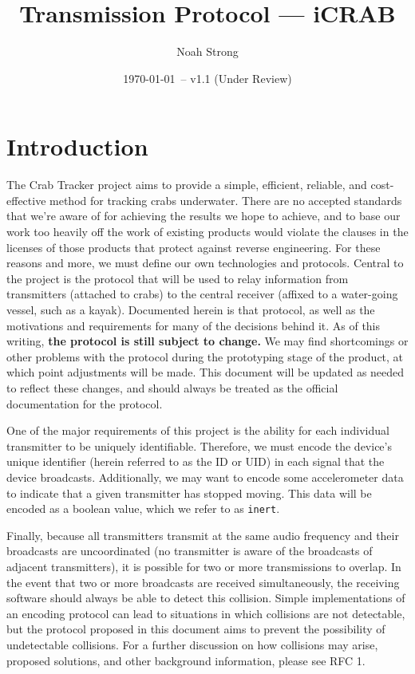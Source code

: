 \documentclass[12pt]{article}
\title{Transmission Protocol --- iCRAB}
\author{
	Noah Strong
}
\date{\today\ -- v1.1 (Under Review)}
\begin{document}
\maketitle

\tableofcontents{}

\newpage

\section{Introduction} \label{introduction}

The Crab Tracker project aims to provide a simple, efficient, reliable, and
cost-effective method for tracking crabs underwater. There are no accepted
standards that we're aware of for achieving the results we hope to achieve,
and to base our work too heavily off the work of existing products would
violate the clauses in the licenses of those products that protect against
reverse engineering.
For these reasons and more, we must define our own technologies and protocols.
Central to the project is the protocol that will be used to relay information
from transmitters (attached to crabs) to the central receiver (affixed to a
water-going vessel, such as a kayak).
Documented herein is that protocol, as well as the motivations and requirements
for many of the decisions behind it.
As of this writing, {\bf the protocol is still subject to change.}
We may find shortcomings or other problems with the protocol during
the prototyping stage of the product, at which point adjustments will be made.
This document will be updated as needed to reflect these changes,
and should always be treated as the official documentation for the protocol.

One of the major requirements of this project is the ability for each
individual transmitter to be uniquely identifiable. Therefore, we must encode
the device's unique identifier (herein referred to as the ID or UID) in each
signal that the device broadcasts.
Additionally, we may want to encode some accelerometer data to indicate that a
given transmitter has stopped moving.
This data will be encoded as a boolean value, which we refer to as
\texttt{inert}.

Finally, because all transmitters transmit at the same audio frequency
and their broadcasts are uncoordinated (no transmitter is aware of the
broadcasts of adjacent transmitters),
it is possible for two or more transmissions to overlap.
In the event that two or more broadcasts are received simultaneously,
the receiving software should always be able to detect this collision.
Simple implementations
of an encoding protocol can lead to situations in which collisions are not
detectable, but the protocol proposed in this document aims to prevent the
possibility of undetectable collisions. For a further discussion on how
collisions may arise, proposed solutions, and other background information,
please see RFC 1.
\end{document}
